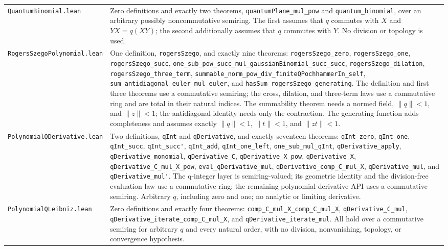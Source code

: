 \documentclass[11pt,oneside]{article}
\theoremstyle{definition}
\theoremstyle{remark}
\begin{document}
\begin{longtable}{>{\raggedright\arraybackslash}p{} >{\raggedright\arraybackslash}p{}}
\nolinkurl{QuantumBinomial.lean} & Zero definitions and exactly two theorems, \nolinkurl{quantumPlane_mul_pow} and \nolinkurl{quantum_binomial}, over an arbitrary possibly noncommutative semiring.  The first assumes that \(q\) commutes with \(X\) and \(YX=q(XY)\); the second additionally assumes that \(q\) commutes with \(Y\).  No division or topology is used. \\
\nolinkurl{RogersSzegoPolynomial.lean} & One definition, \nolinkurl{rogersSzego}, and exactly nine theorems: \nolinkurl{rogersSzego_zero}, \nolinkurl{rogersSzego_one}, \nolinkurl{rogersSzego_succ}, \nolinkurl{one_sub_pow_succ_mul_gaussianBinomial_succ_succ}, \nolinkurl{rogersSzego_dilation}, \nolinkurl{rogersSzego_three_term}, \nolinkurl{summable_norm_pow_div_finiteQPochhammerIn_self}, \nolinkurl{sum_antidiagonal_euler_mul_euler}, and \nolinkurl{hasSum_rogersSzego_generating}.  The definition and first three theorems use a commutative semiring; the cross, dilation, and three-term laws use a commutative ring and are total in their natural indices.  The summability theorem needs a normed field, \(\lVert q\rVert<1\), and \(\lVert z\rVert<1\); the antidiagonal identity needs only the contraction.  The generating function adds completeness and assumes exactly \(\lVert q\rVert<1\), \(\lVert t\rVert<1\), and \(\lVert zt\rVert<1\). \\
\nolinkurl{PolynomialQDerivative.lean} & Two definitions, \nolinkurl{qInt} and \nolinkurl{qDerivative}, and exactly seventeen theorems: \nolinkurl{qInt_zero}, \nolinkurl{qInt_one}, \nolinkurl{qInt_succ}, \nolinkurl{qInt_succ'}, \nolinkurl{qInt_add}, \nolinkurl{qInt_one_left}, \nolinkurl{one_sub_mul_qInt}, \nolinkurl{qDerivative_apply}, \nolinkurl{qDerivative_monomial}, \nolinkurl{qDerivative_C}, \nolinkurl{qDerivative_X_pow}, \nolinkurl{qDerivative_X}, \nolinkurl{qDerivative_C_mul_X_pow}, \nolinkurl{eval_qDerivative_mul}, \nolinkurl{qDerivative_comp_C_mul_X}, \nolinkurl{qDerivative_mul}, and \nolinkurl{qDerivative_mul'}.  The q-integer layer is semiring-valued; its geometric identity and the division-free evaluation law use a commutative ring; the remaining polynomial derivative API uses a commutative semiring.  Arbitrary \(q\), including zero and one; no analytic or limiting derivative. \\
\nolinkurl{PolynomialQLeibniz.lean} & Zero definitions and exactly four theorems: \nolinkurl{comp_C_mul_X_comp_C_mul_X}, \nolinkurl{qDerivative_C_mul}, \nolinkurl{qDerivative_iterate_comp_C_mul_X}, and \nolinkurl{qDerivative_iterate_mul}.  All hold over a commutative semiring for arbitrary \(q\) and every natural order, with no division, nonvanishing, topology, or convergence hypothesis. \\

\end{longtable}
\end{document}
